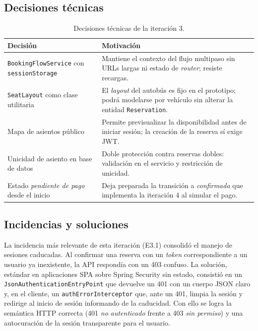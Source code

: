 \subsection{Decisiones técnicas}

\begin{table}[h!]
\centering
\small
\begin{tabular}{|p{5.5cm}|p{8.5cm}|}
\hline
\textbf{Decisión} & \textbf{Motivación} \\ \hline
\texttt{BookingFlowService} con \texttt{sessionStorage} & Mantiene el contexto del flujo multipaso sin URLs largas ni estado de \textit{router}; resiste recargas. \\ \hline
\texttt{SeatLayout} como clase utilitaria & El \textit{layout} del autobús es fijo en el prototipo; podrá modelarse por vehículo sin alterar la entidad \texttt{Reservation}. \\ \hline
Mapa de asientos público & Permite previsualizar la disponibilidad antes de iniciar sesión; la creación de la reserva sí exige JWT. \\ \hline
Unicidad de asiento en base de datos & Doble protección contra reservas dobles: validación en el servicio y restricción de unicidad. \\ \hline
Estado \textit{pendiente de pago} desde el inicio & Deja preparada la transición a \textit{confirmada} que implementa la iteración 4 al simular el pago. \\ \hline
\end{tabular}
\caption{Decisiones técnicas de la iteración 3.}
\label{tab:dec-it3}
\end{table}

\subsection{Incidencias y soluciones}

La incidencia más relevante de esta iteración (E3.1) consolidó el manejo de sesiones caducadas. Al confirmar una reserva con un \textit{token} correspondiente a un usuario ya inexistente, la API respondía con un 403 confuso. La solución, estándar en aplicaciones SPA sobre Spring Security sin estado, consistió en un \texttt{JsonAuthenticationEntryPoint} que devuelve un 401 con un cuerpo JSON claro y, en el cliente, un \texttt{authErrorInterceptor} que, ante un 401, limpia la sesión y redirige al inicio de sesión informando de la caducidad. Con ello se logra la semántica HTTP correcta (401 \textit{no autenticado} frente a 403 \textit{sin permiso}) y una autocuración de la sesión transparente para el usuario.

